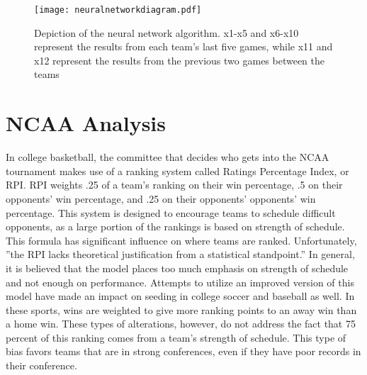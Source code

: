 \documentclass[sigconf]{acmart}
\begin{document}
\begin{figure}[h!]
\centering
\texttt{[image: neuralnetworkdiagram.pdf]}
\caption{Depiction of the neural network algorithm. x1-x5 and x6-x10 represent the results from each team's last five games, while x11 and x12 represent the results from the previous two games between the teams \cite{FuzzyModel}}
\label{fig:Nerual network depiction}
\end{figure}

\section{NCAA Analysis}
In college basketball, the committee that decides who gets into the NCAA tournament makes use of a ranking system called Ratings Percentage Index, or RPI. RPI weights .25 of a team's ranking on their win percentage, .5 on their opponents' win percentage, and .25 on their opponents' opponents' win percentage. \cite{RPI} This system is designed to encourage teams to schedule difficult opponents, as a large portion of the rankings is based on strength of schedule.
This formula has significant influence on where teams are ranked. Unfortunately, ''the RPI lacks theoretical justification from a statistical standpoint.'' \cite{RPI} In general, it is believed that the model places too much emphasis on strength of schedule and not enough on performance. Attempts to utilize an improved version of this model have made an impact on seeding in college soccer and baseball as well. In these sports, wins are weighted to give more ranking points to an away win than a home win.\cite{RPI} These types of alterations, however, do not address the fact that 75 percent of this ranking comes from a team's strength of schedule. This type of bias favors teams that are in strong conferences, even if they have poor records in their conference. 
\end{document}
